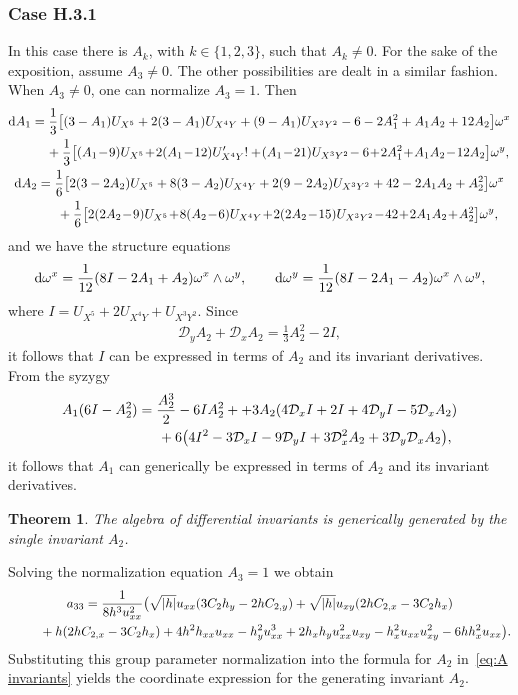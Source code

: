 \documentclass[10pt,a4paper]{amsart}
\numberwithin{equation}{section}
\newtheorem{Theorem}{Theorem}[section]
\newcommand{\D}{\mathcal{D}}
\begin{document}
\subsubsection{Case H.3.1}

In this case there is $A_k$, with $k\in \{1,2,3\}$, such that $A_k\neq 0$. For the sake of the exposition, assume $A_3 \neq 0$. The other possibilities are dealt in a similar fashion. When $A_3\neq 0$, one can normalize $A_3=1$. Then
\begin{gather*}
{\rm d}A_1 = \frac{1}{3}\big[(3-A_1)U_{X^5} +2(3-A_1)U_{X^4Y}+(9-A_1) U_{X^3Y^2}-6-2A_1^2+A_1A_2+12A_2\big]\omega^x
\\ \hphantom{{\rm d}A_1 =}
{}+\frac{1}{3}\big[(A_1\!-\!9)U_{X^5} \!+\!2(A_1\!-\!12)U_{X^4Y}'! +\! (A_1\!-\!21)U_{X^3Y^2}\!-6 \!+\!2 A_1^2\!+\! A_1 A_2 \!- \!12 A_2\big]\omega^y,
\\
{\rm d}A_2 = \frac{1}{6}\big[2(3-2A_2)U_{X^5}+8(3-A_2)U_{X^4Y}+2(9-2A_2)U_{X^3Y^2}+42-2A_1A_2 + A_2^2\big]\omega^x
\\ \hphantom{{\rm d}A_2 =}
{}+\frac{1}{6}\big[2(2A_2\!-\!9)U_{X^5} \!+\!8(A_2\!-\!6)U_{X^4Y} \!+\! 2(2A_2\!-\!15)U_{X^3Y^2}\!-\!42\!+\!2A_1A_2 \!+\! A_2^2\big]\omega^y,
\end{gather*}
%
and we have the structure equations
\begin{gather*}
{\rm d}\omega^x = \frac{1}{12}(8I-2A_1+A_2)\omega^x\wedge \omega^y, \qquad
{\rm d}\omega^y = \frac{1}{12}(8I-2A_1-A_2)\omega^x\wedge \omega^y,
\end{gather*}
where $I= U_{X^5}+2U_{X^4Y} + U_{X^3Y^2}$. Since
\begin{gather*}
\D_y A_2 + \D_x A_2 = \frac{1}{3}A_2^2-2I,
\end{gather*}
it follows that $I$ can be expressed in terms of $A_2$ and its invariant derivatives. From the syzygy
\begin{gather*}
A_1(6I-A_2^2) =\frac{A_2^3}{2} - 6I A_2^2 + +3A_2(4\D_xI + 2I + 4 \D_yI-5\D_xA_2)
\\ \hphantom{A_1(6I-A_2^2) =}
{}+ 6\big(4I^2-3\D_xI - 9 \D_yI+3\D_x^2A_2 + 3\D_y\D_xA_2\big),
\end{gather*}
it follows that $A_1$ can generically be expressed in terms of $A_2$ and its invariant derivatives.


\begin{Theorem}
The algebra of differential invariants is generically generated by the single inva\-riant $A_2$.
\end{Theorem}

\begin{Remark}
Solving the normalization equation $A_3=1$ we obtain
\begin{gather*}
a_{33} = \frac{1}{8h^3 u_{xx}^2}\big(\sqrt{|h|}u_{xx}(3C_2h_y-2hC_{2,y})+\sqrt{|h|}u_{xy}(2hC_{2,x}-3C_2h_x)
\\ \hphantom{a_{33} =}
{}+h(2hC_{2,x}-3C_2h_x)+4h^2h_{xx}u_{xx}-h_y^2u_{xx}^3+2h_xh_yu_{xx}^2u_{xy}-h_x^2u_{xx}u_{xy}^2-6hh_x^2u_{xx}\big).
\end{gather*}
%
Substituting this group parameter normalization into the formula for $A_2$ in~\eqref{eq:A invariants} yields the coordinate expression for the generating invariant $A_2$.
\end{Remark}
\end{document}
